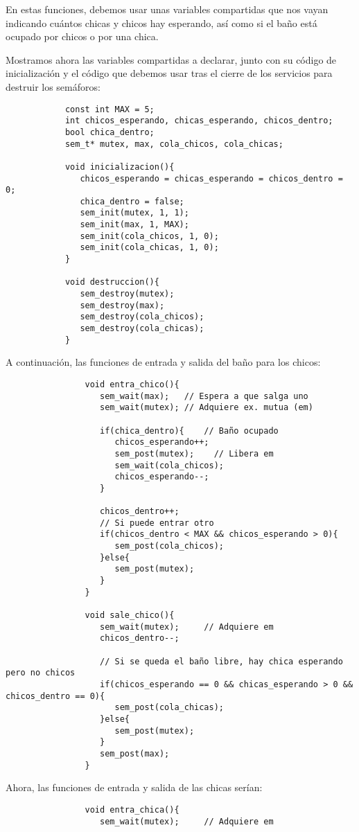 \begin{ejercicio}
\begin{description}
            En estas funciones, debemos usar unas variables compartidas que nos vayan indicando cuántos chicas y chicos hay esperando, así como si el baño está ocupado por chicos o por una chica.

            Mostramos ahora las variables compartidas a declarar, junto con su código de inicialización y el código que debemos usar tras el cierre de los servicios para destruir los semáforos:
            \begin{verbatim}
            const int MAX = 5;
            int chicos_esperando, chicas_esperando, chicos_dentro;
            bool chica_dentro;
            sem_t* mutex, max, cola_chicos, cola_chicas;

            void inicializacion(){
               chicos_esperando = chicas_esperando = chicos_dentro = 0;
               chica_dentro = false;
               sem_init(mutex, 1, 1);
               sem_init(max, 1, MAX);
               sem_init(cola_chicos, 1, 0);
               sem_init(cola_chicas, 1, 0);
            }

            void destruccion(){
               sem_destroy(mutex);
               sem_destroy(max);
               sem_destroy(cola_chicos);
               sem_destroy(cola_chicas);
            }
            \end{verbatim}
            A continuación, las funciones de entrada y salida del baño para los chicos:
            \begin{verbatim}
                void entra_chico(){
                   sem_wait(max);   // Espera a que salga uno
                   sem_wait(mutex); // Adquiere ex. mutua (em)

                   if(chica_dentro){    // Baño ocupado
                      chicos_esperando++;
                      sem_post(mutex);    // Libera em
                      sem_wait(cola_chicos);
                      chicos_esperando--;
                   }

                   chicos_dentro++;
                   // Si puede entrar otro
                   if(chicos_dentro < MAX && chicos_esperando > 0){
                      sem_post(cola_chicos);
                   }else{
                      sem_post(mutex);
                   }
                }

                void sale_chico(){
                   sem_wait(mutex);     // Adquiere em
                   chicos_dentro--;

                   // Si se queda el baño libre, hay chica esperando pero no chicos
                   if(chicos_esperando == 0 && chicas_esperando > 0 && chicos_dentro == 0){
                      sem_post(cola_chicas);
                   }else{
                      sem_post(mutex);
                   }
                   sem_post(max);
                }
            \end{verbatim}
            Ahora, las funciones de entrada y salida de las chicas serían:
            \begin{verbatim}
                void entra_chica(){
                   sem_wait(mutex);     // Adquiere em


\end{verbatim}
\end{description}
\end{ejercicio}
